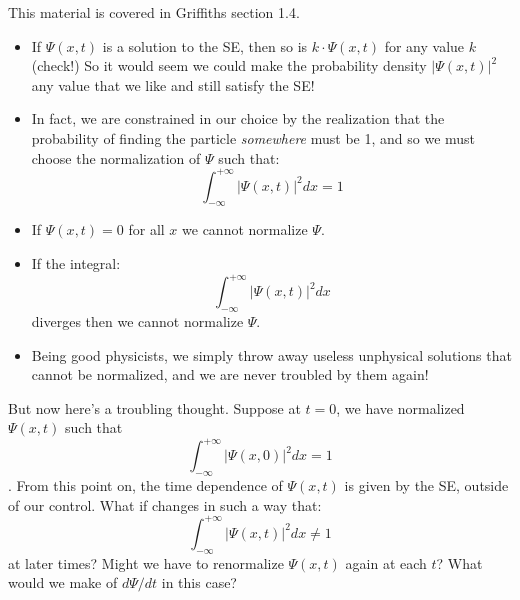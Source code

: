\documentclass[12pt]{book}
\begin{document}
This material is covered in Griffiths section 1.4.  
\begin{itemize}
 \item If $\Psi(x,t)$ is a solution to the SE, then so is $k \cdot \Psi(x,t)$ for any value $k$ (check!)  So it would seem we could make the probability density $|\Psi(x,t)|^2$ any value that we like and still satisfy the SE!  
 \item In fact, we are constrained in our choice by the realization that the probability of finding the particle {\em somewhere} must be 1, and so we must choose the normalization of $\Psi$ such that:
\begin{equation}
\label{eqn:norm}
\int_{-\infty}^{+\infty} |\Psi(x,t)|^2 dx = 1
\end{equation}

\item If $\Psi(x,t)=0$ for all $x$ we cannot normalize $\Psi$.
 \item If the integral:
$$\int_{-\infty}^{+\infty} |\Psi(x,t)|^2 dx$$
diverges then we cannot normalize $\Psi$.
\item Being good physicists, we simply throw away useless unphysical solutions that cannot be normalized, and we are never troubled by them again! 
\end{itemize}

But now here's a troubling thought.  Suppose at $t=0$, we have normalized $\Psi(x,t)$ such that
$$\int_{-\infty}^{+\infty} |\Psi(x,0)|^2 dx = 1$$.  
From this point on, the time dependence of $\Psi(x,t)$ is given by the SE, outside of our control.  What if changes in such a way that:
$$\int_{-\infty}^{+\infty} |\Psi(x,t)|^2 dx \neq 1$$ 
at later times?  Might we have to renormalize $\Psi(x,t)$ again at each $t$?  What would we make of $d\Psi/dt$ in this case?
\end{document}
